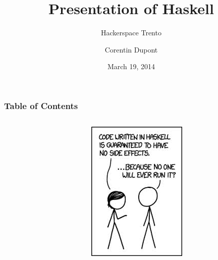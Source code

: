 \documentclass{beamer}
\begin{document}

\title{Presentation of Haskell}
\subtitle{Hackerspace Trento}
\author{Corentin Dupont}

\date{March 19, 2014}

\maketitle

\begin{frame}
  \frametitle{Table of Contents}
  \begin{columns}[]
   \begin{column}[]{5cm}
    \tableofcontents[]
   \end{column}
   \begin{column}[]{5cm}
    \includegraphics[width=1\linewidth]{figs/xkcd}
   \end{column}
  \end{columns}
\end{frame}
\end{document}
